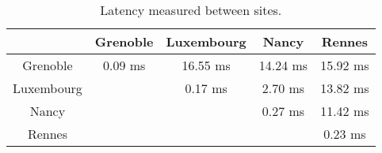 \begin{table}[t!]

  \begin{center}
    \begin{tabular}{|c|c|c|c|c|}   

      \hline \multicolumn{1}{|p{2cm}|}{ } & \multicolumn{1}{|p{2cm}|}{\centering Grenoble }  & \multicolumn{1}{|p{2cm}|}{\centering Luxembourg } & \multicolumn{1}{|p{2cm}|}{\centering Nancy }& \multicolumn{1}{|p{2cm}|}{\centering Rennes } \\

      \hline
      Grenoble & 0.09 ms & 16.55 ms & 14.24 ms & 15.92 ms \\

      \hline
      Luxembourg &  & 0.17 ms & 2.70 ms & 13.82 ms \\

      \hline
      Nancy & &  & 0.27 ms & 11.42 ms \\

      \hline
      Rennes &  &  &  & 0.23 ms \\

      \hline
    \end{tabular}
  \end{center}
  \caption{\label{latency_table} Latency measured between sites.}
\end{table}





